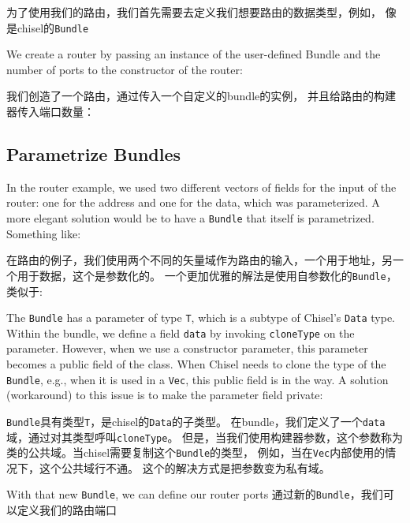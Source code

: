 \documentclass[%
    10pt,
    headinclude, footexclude,
    openright, %
    notitlepage,
    cleardoubleempty,
    headsepline,
    pointlessnumbers,
    bibtotoc, idxtotoc,
    ]{scrbook}
\newcommand{\code}[1]{{\small{\texttt{#1}}}}
\begin{document}
\noindent 为了使用我们的路由，我们首先需要去定义我们想要路由的数据类型，例如，
像是chisel的\code{Bundle}


\noindent We create a router by passing an instance of the user-defined Bundle and
the number of ports to the constructor of the router:

\noindent 我们创造了一个路由，通过传入一个自定义的bundle的实例，
并且给路由的构建器传入端口数量：



\subsection{Parametrize Bundles}

In the router example, we used two different vectors of fields for the input
of the router: one for the address and one for the data, which was parameterized.
A more elegant solution would be to have a \code{Bundle} that itself
is parametrized. Something like:

在路由的例子，我们使用两个不同的矢量域作为路由的输入，一个用于地址，另一个用于数据，这个是参数化的。
一个更加优雅的解法是使用自参数化的\code{Bundle}，类似于:


The \code{Bundle} has a parameter of type \code{T}, which is a subtype
of Chisel's \code{Data} type.
Within the bundle, we define a field \code{data} by invoking \code{cloneType}
on the parameter.
However, when we use a constructor parameter, this parameter becomes a
public field of the class. When Chisel needs to clone the type of the \code{Bundle},
e.g., when it is used in a \code{Vec}, this public field is in the way.
A solution (workaround) to this issue is to make the parameter field private:

\code{Bundle}具有类型\code{T}，是chisel的\code{Data}的子类型。
在bundle，我们定义了一个\code{data}域，通过对其类型呼叫\code{cloneType}。
但是，当我们使用构建器参数，这个参数称为类的公共域。当chisel需要复制这个\code{Bundle}的类型，
例如，当在\code{Vec}内部使用的情况下，这个公共域行不通。
这个的解决方式是把参数变为私有域。


\noindent With that new \code{Bundle}, we can define our router ports
\noindent 通过新的\code{Bundle}，我们可以定义我们的路由端口

\end{document}
